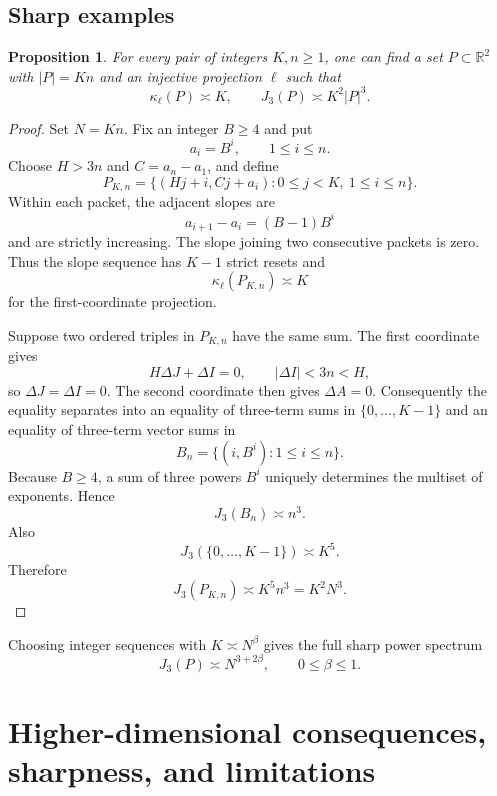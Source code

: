 \documentclass[11pt]{amsart}
\numberwithin{equation}{section}
\newtheorem{proposition}[theorem]{Proposition}
\theoremstyle{definition}
\theoremstyle{remark}
\newcommand{\R}{\mathbb R}
\newcommand{\1}{\mathbf 1}
\newcommand{\card}[1]{\lvert #1\rvert}
\begin{document}
\subsection{Sharp examples}
\begin{proposition}\label{prop:turning-sharp}
For every pair of integers $K,n\geq1$, one can find a set $P\subset\R^2$ with $\card P=Kn$ and an injective projection $\ell$ such that
\[
 \kappa_\ell(P)\asymp K,
 \qquad
 J_3(P)\asymp K^2\card P^3.
\]
\end{proposition}

\begin{proof}
Set $N=Kn$.  Fix an integer $B\geq4$ and put
\[
 a_i=B^i,
 \qquad 1\leq i\leq n.
\]
Choose $H>3n$ and $C=a_n-a_1$, and define
\begin{equation}\label{eq:packet-example}
 P_{K,n}=\{(Hj+i,Cj+a_i):0\leq j<K,\ 1\leq i\leq n\}.
\end{equation}
Within each packet, the adjacent slopes are
\[
 a_{i+1}-a_i=(B-1)B^i
\]
and are strictly increasing.  The slope joining two consecutive packets is zero.  Thus the slope sequence has $K-1$ strict resets and
\[
 \kappa_\ell(P_{K,n})\asymp K
\]
for the first-coordinate projection.

Suppose two ordered triples in $P_{K,n}$ have the same sum.  The first coordinate gives
\[
 H\Delta J+\Delta I=0,
 \qquad \card{\Delta I}<3n<H,
\]
so $\Delta J=\Delta I=0$.  The second coordinate then gives $\Delta A=0$.  Consequently the equality separates into an equality of three-term sums in $\{0,\dots,K-1\}$ and an equality of three-term vector sums in
\[
 B_n=\{(i,B^i):1\leq i\leq n\}.
\]
Because $B\geq4$, a sum of three powers $B^i$ uniquely determines the multiset of exponents.  Hence
\[
 J_3(B_n)\asymp n^3.
\]
Also
\[
 J_3(\{0,\dots,K-1\})\asymp K^5.
\]
Therefore
\[
 J_3(P_{K,n})\asymp K^5n^3=K^2N^3.
\]
\end{proof}

Choosing integer sequences with $K\asymp N^\beta$ gives the full sharp power spectrum
\[
 J_3(P)\asymp N^{3+2\beta},
 \qquad 0\leq\beta\leq1.
\]

\section{Higher-dimensional consequences, sharpness, and limitations}\label{sec:higher-dimensional}
\end{document}
